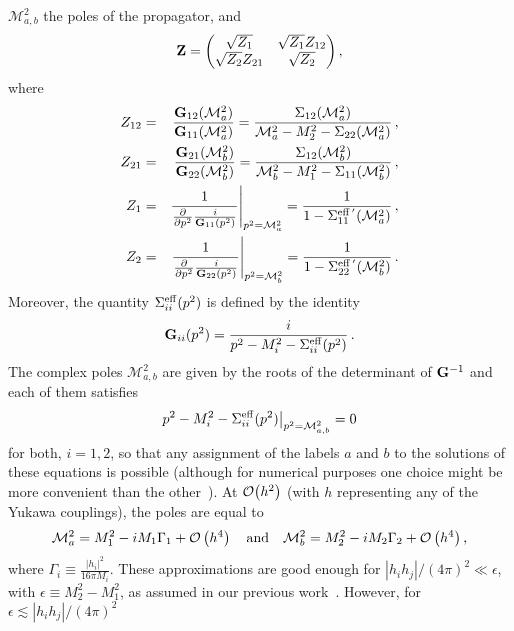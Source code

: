 \documentclass[11pt,a4paper]{article}
\providecommand{\abs}[1]{\left\lvert #1 \right\rvert}
\providecommand{\abss}[1]{\left\lvert #1 \right\rvert^2}
\providecommand{\order}[1]{{\cal O} \left( #1 \right)}
\providecommand{\torder}[1]{{\cal O} \bigl( #1 \bigr)}
\providecommand{\cpm}[0]{\mathcal{M}}
\begin{document}
$\cpm_{a,b}^2$ the poles of the propagator, and
\begin{equation}
\label{equation_zmatrix}
{\bf Z} = 
\begin{pmatrix}
\sqrt{Z_1} &  \sqrt{Z_1} Z_{12}\\
\sqrt{Z_2} Z_{21} & \sqrt{Z_2}
\end{pmatrix},
\end{equation}
where
\begin{eqnarray}
\label{equation_zelements}
Z_{12} &=& \frac{{\bf G}_{12}(\cpm_{a}^2)}{{\bf G}_{11}(\cpm_{a}^2)} = \frac{\Sigma_{12}(\cpm_{a}^2)}{\cpm_{a}^2  - M_2^2 - \Sigma_{22}(\cpm_{a}^2)} \, ,  \notag \\
Z_{21} &=& \frac{{\bf G}_{21}(\cpm_{b}^2)}{{\bf G}_{22}(\cpm_{b}^2)} = \frac{\Sigma_{12}(\cpm_{b}^2)}{\cpm_{b}^2  - M_1^2 - \Sigma_{11}(\cpm_{b}^2)} \, , \notag \\
Z_1 &=& \frac{1}{\frac{\partial}{\partial p^2} \frac{i}{{\bf G}_{11} (p^2)}} \Biggr\rvert_{p^2 = \cpm_{a}^2} = \frac{1}{1-\Sigma_{11}^{\rm eff \, '}(\cpm_{a}^2)} \, , \notag \\
Z_2 &=& \frac{1}{\frac{\partial}{\partial p^2} \frac{i}{{\bf G}_{22} (p^2)}} \Biggr\rvert_{p^2 = \cpm_{b}^2} =\frac{1}{1-\Sigma_{22}^{\rm eff \, '}(\cpm_{b}^2)}\, . 
\end{eqnarray}
Moreover, the quantity $\Sigma_{ii}^{\rm eff} (p^2)$ is defined by the identity
\begin{equation}
{\bf G}_{ii} (p^2) = \frac{i}{p^2 - M_i^2 - \Sigma_{ii}^{\rm eff} (p^2)} \, .
\end{equation}
The complex poles $\cpm_{a,b}^2$ are given by the roots of the determinant of ${\bf G}^{-1}$ and each of them satisfies
\begin{equation}
p^2 - M_i^2 - \Sigma_{ii}^{\rm eff} (p^2)\bigr\rvert_{p^2 = \cpm_{a,b}^2} = 0
\end{equation}
for both, $i=1,2$, so that any assignment of the labels $a$ and $b$ to the solutions of these equations is possible (although for numerical purposes one choice might be more convenient than the other~\cite{fuchs16}). At $\torder{h^2}$ (with $h$ representing any of the Yukawa couplings), the poles are equal to
\begin{equation*}
\cpm_a^2 = M_1^2 - i M_1 \Gamma_1 + \order{h^4} \quad {\rm and} \quad
\cpm_b^2 = M_2^2 - i M_2 \Gamma_2 + \order{h^4},
\end{equation*}
where $\Gamma_i \equiv \tfrac{\abss{h_i}}{16 \pi M_i}$.
These approximations are good enough for $\abs{h_i h_j}/(4 \pi)^2 \ll \epsilon$, with $\epsilon \equiv M_2^2 - M_1^2$, as assumed in our previous work~\cite{Racker20}. However, for $\epsilon \lesssim \abs{h_i h_j}/(4 \pi)^2$
\end{document}
